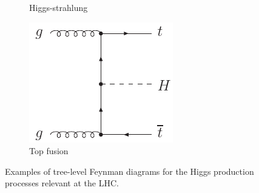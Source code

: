 \begin{figure}
\begin{subfigure}[b]{0.33\textwidth}
		\caption{Higgs-strahlung}
		\label{fig:feyn:VH}
	\end{subfigure}
	\hfill
	\begin{subfigure}[b]{0.25\textwidth}
		\includegraphics[width=\textwidth]{axodraw/ttH.pdf}
		\caption{Top fusion}
		\label{fig:feyn:ttH}
	\end{subfigure}
	\hfill\null
	\caption{Examples of tree-level Feynman diagrams for the Higgs production processes relevant at the \ac{LHC}.}
	\label{fig:feyn}
\end{figure}


